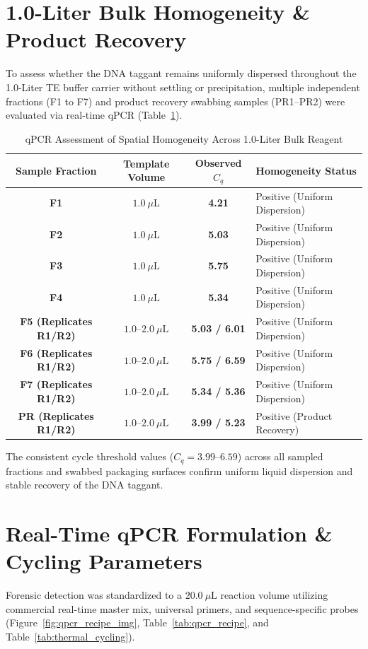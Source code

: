 \section{1.0-Liter Bulk Homogeneity \& Product Recovery}
To assess whether the DNA taggant remains uniformly dispersed throughout the 1.0-Liter TE buffer carrier without settling or precipitation, multiple independent fractions (F1 to F7) and product recovery swabbing samples (PR1--PR2) were evaluated via real-time qPCR (Table~\ref{tab:homogeneity_data}).

\begin{table}[H]
\centering
\small
\caption{qPCR Assessment of Spatial Homogeneity Across 1.0-Liter Bulk Reagent}
\label{tab:homogeneity_data}
\begin{tabularx}{\textwidth}{c c c X}
\toprule
\textbf{Sample Fraction} & \textbf{Template Volume} & \textbf{Observed $C_q$} & \textbf{Homogeneity Status} \\
\midrule
\textbf{F1} & $1.0~\mu\text{L}$ & \textbf{4.21} & Positive (Uniform Dispersion) \\
\textbf{F2} & $1.0~\mu\text{L}$ & \textbf{5.03} & Positive (Uniform Dispersion) \\
\textbf{F3} & $1.0~\mu\text{L}$ & \textbf{5.75} & Positive (Uniform Dispersion) \\
\textbf{F4} & $1.0~\mu\text{L}$ & \textbf{5.34} & Positive (Uniform Dispersion) \\
\textbf{F5 (Replicates R1/R2)} & $1.0\text{--}2.0~\mu\text{L}$ & \textbf{5.03 / 6.01} & Positive (Uniform Dispersion) \\
\textbf{F6 (Replicates R1/R2)} & $1.0\text{--}2.0~\mu\text{L}$ & \textbf{5.75 / 6.59} & Positive (Uniform Dispersion) \\
\textbf{F7 (Replicates R1/R2)} & $1.0\text{--}2.0~\mu\text{L}$ & \textbf{5.34 / 5.36} & Positive (Uniform Dispersion) \\
\textbf{PR (Replicates R1/R2)} & $1.0\text{--}2.0~\mu\text{L}$ & \textbf{3.99 / 5.23} & Positive (Product Recovery) \\
\bottomrule
\end{tabularx}
\end{table}

The consistent cycle threshold values ($C_q = 3.99\text{--}6.59$) across all sampled fractions and swabbed packaging surfaces confirm uniform liquid dispersion and stable recovery of the DNA taggant.

\section{Real-Time qPCR Formulation \& Cycling Parameters}
Forensic detection was standardized to a $20.0~\mu\text{L}$ reaction volume utilizing commercial real-time master mix, universal primers, and sequence-specific probes (Figure~\ref{fig:qpcr_recipe_img}, Table~\ref{tab:qpcr_recipe}, and Table~\ref{tab:thermal_cycling}).

